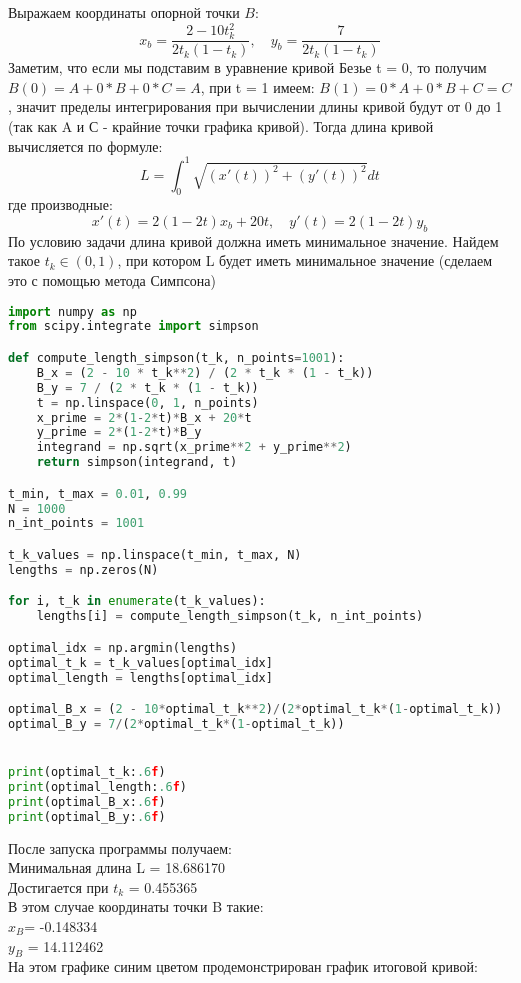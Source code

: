\documentclass{article}
\begin{document}
Выражаем координаты опорной точки $B$:
\[
x_b = \frac{2 - 10t_k^2}{2t_k(1-t_k)}, \quad y_b = \frac{7}{2t_k(1-t_k)}
\]
Заметим, что если мы подставим в уравнение кривой Безье t = 0, то получим $B(0) = A + 0*B + 0 * C = A$, при t = 1 имеем: $B(1) = 0*A + 0*B + C = C$, значит пределы интегрирования при вычислении длины кривой будут от 0 до 1 (так как A и С - крайние точки графика кривой).
Тогда длина кривой вычисляется по формуле:
\[
L = \int_0^1 \sqrt{(x'(t))^2 + (y'(t))^2} dt
\]
где производные:
\[
x'(t) = 2(1-2t)x_b + 20t, \quad y'(t) = 2(1-2t)y_b
\]
По условию задачи длина кривой должна иметь минимальное значение. Найдем такое $t_k \in (0,1)$, при котором L будет иметь минимальное значение (сделаем это с помощью метода Симпсона)
\begin{lstlisting}[language=Python]
import numpy as np
from scipy.integrate import simpson

def compute_length_simpson(t_k, n_points=1001):
    B_x = (2 - 10 * t_k**2) / (2 * t_k * (1 - t_k))
    B_y = 7 / (2 * t_k * (1 - t_k))
    t = np.linspace(0, 1, n_points)
    x_prime = 2*(1-2*t)*B_x + 20*t
    y_prime = 2*(1-2*t)*B_y
    integrand = np.sqrt(x_prime**2 + y_prime**2)
    return simpson(integrand, t)

t_min, t_max = 0.01, 0.99 
N = 1000                  
n_int_points = 1001      

t_k_values = np.linspace(t_min, t_max, N)
lengths = np.zeros(N)

for i, t_k in enumerate(t_k_values):
    lengths[i] = compute_length_simpson(t_k, n_int_points)

optimal_idx = np.argmin(lengths)
optimal_t_k = t_k_values[optimal_idx]
optimal_length = lengths[optimal_idx]

optimal_B_x = (2 - 10*optimal_t_k**2)/(2*optimal_t_k*(1-optimal_t_k))
optimal_B_y = 7/(2*optimal_t_k*(1-optimal_t_k))


print(optimal_t_k:.6f)
print(optimal_length:.6f)
print(optimal_B_x:.6f)
print(optimal_B_y:.6f)
\end{lstlisting}
После запуска программы получаем:\\
Минимальная длина L = 18.686170 \\
Достигается при $t_k$ = 0.455365 \\
В этом случае координаты точки B такие:\\
$x_B$= -0.148334 \\
$y_B$ = 14.112462 \\
\newpage
На этом графике синим цветом продемонстрирован график итоговой кривой:\\
\end{document}
